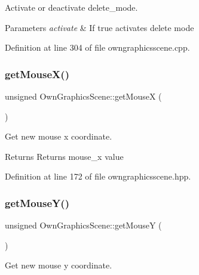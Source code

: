 Activate or deactivate delete\+\_\+mode. 


\begin{DoxyParams}{Parameters}
{\em activate} & If true activates delete mode \\
\hline
\end{DoxyParams}


Definition at line 304 of file owngraphicsscene.\+cpp.

\mbox{\label{classOwnGraphicsScene_a6e54bd43db758bcd4f7cc1dd4544232e}} 
\subsubsection{\texorpdfstring{get\+Mouse\+X()}{getMouseX()}}
{\footnotesize\ttfamily unsigned Own\+Graphics\+Scene\+::get\+MouseX (\begin{DoxyParamCaption}{ }\end{DoxyParamCaption})\hspace{0.3cm}{\ttfamily [inline]}}



Get new mouse x coordinate. 

\begin{DoxyReturn}{Returns}
Returns mouse\+\_\+x value 
\end{DoxyReturn}


Definition at line 172 of file owngraphicsscene.\+hpp.

\mbox{\label{classOwnGraphicsScene_a3fd2942e9930fc2dda41844622dc8a35}} 
\subsubsection{\texorpdfstring{get\+Mouse\+Y()}{getMouseY()}}
{\footnotesize\ttfamily unsigned Own\+Graphics\+Scene\+::get\+MouseY (\begin{DoxyParamCaption}{ }\end{DoxyParamCaption})\hspace{0.3cm}{\ttfamily [inline]}}



Get new mouse y coordinate. 

